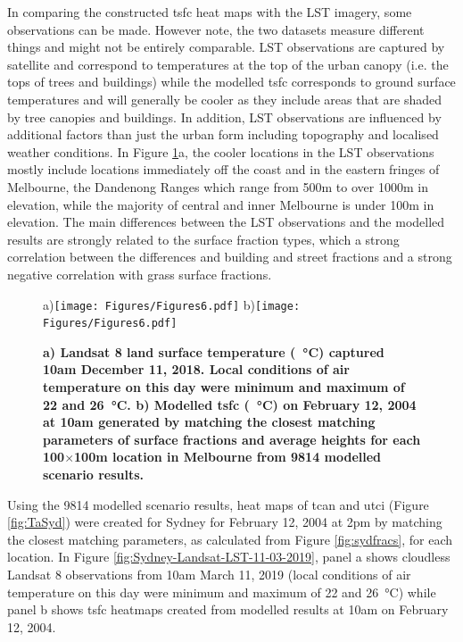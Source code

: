 \documentclass[final,3p,times,authoryear]{elsarticle}
\begin{document}
In comparing the constructed \gls{tsfc} heat maps with the LST imagery, some observations can be made. However note, the two datasets measure different things and might not be entirely comparable. LST observations are captured by satellite and correspond to temperatures at the top of the urban canopy (i.e. the tops of trees and buildings) while the modelled \gls{tsfc} corresponds to ground surface temperatures and will generally be cooler as they include areas that are shaded by tree canopies and buildings. In addition, LST observations are influenced by additional factors than just the urban form including topography and localised weather conditions. In Figure \ref{fig:Melb_TSFC12_85}a, the cooler locations in the LST observations mostly include locations immediately off the coast and in the eastern fringes of Melbourne, the Dandenong Ranges which range from 500m to over 1000m in elevation, while the majority of central and inner Melbourne is under 100m in elevation. The main differences between the LST observations and the modelled results are strongly related to the surface fraction types, which a strong correlation between the differences and building and street fractions and a strong negative correlation with grass surface fractions. 

\begin{figure}
\centering
a)\texttt{[image: Figures/Figures6.pdf]}
b)\texttt{[image: Figures/Figures6.pdf]}
\caption{\bf a) Landsat 8 land surface temperature (\SI{}{\degreeCelsius}) captured 10am December 11, 2018. Local conditions of air temperature on this day were minimum and maximum of 22 and 26\SI{}{\degreeCelsius}. b) Modelled \gls{tsfc} (\SI{}{\degreeCelsius}) on February 12, 2004 at 10am generated by matching the closest matching parameters of surface fractions and average heights for each 100$\times$100m location in Melbourne from 9814 modelled scenario results.}
 \label{fig:Melb_TSFC12_85}
\end{figure}


Using the 9814 modelled scenario results, heat maps of \gls{tcan} and \gls{utci} (Figure \ref{fig:TaSyd}) were created for Sydney for February 12, 2004 at 2pm by matching the closest matching parameters, as calculated from Figure \ref{fig:sydfracs}, for each location. In Figure \ref{fig:Sydney-Landsat-LST-11-03-2019}, panel a shows cloudless Landsat 8 observations from 10am March 11, 2019 (local conditions of air temperature on this day were minimum and maximum of 22 and 26\SI{}{\degreeCelsius}) while panel b shows \gls{tsfc} heatmaps created from modelled results at 10am on February 12, 2004. 
\end{document}
